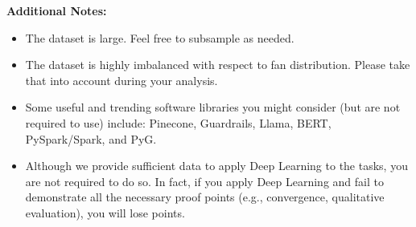 \documentclass[12pt]{article}
\begin{document}
\textbf{Additional Notes:}
\begin{itemize}
    \item The dataset is large. Feel free to subsample as needed.
    \item The dataset is highly imbalanced with respect to fan distribution. Please take that into account during your analysis.
    \item Some useful and trending software libraries you might consider (but are not required to use) include: Pinecone, Guardrails, Llama, BERT, PySpark/Spark, and PyG.
    \item Although we provide sufficient data to apply Deep Learning to the tasks, you are not required to do so. In fact, if you apply Deep Learning and fail to demonstrate all the necessary proof points (e.g., convergence, qualitative evaluation), you will lose points.
\end{itemize}
\end{document}
